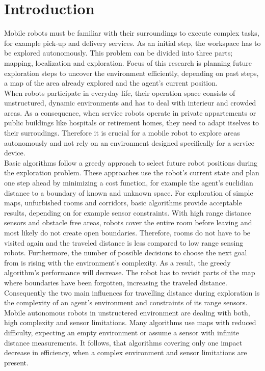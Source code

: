 \documentclass[twocolumn]{svjour3}[2016]
\begin{document}
\section{Introduction}
\label{introduction}
Mobile robots must be familiar with their surroundings to execute complex tasks, for example pick-up and delivery services. As an initial step, the workspace has to be explored autonomously. This problem can be divided into three parts; mapping, localization and exploration. Focus of this research is planning future exploration steps to uncover the environment efficiently, depending on past steps, a map of the area already explored and the agent's current position.\\
When robots participate in everyday life, their operation space consists of unstructured, dynamic environments and has to deal with interieur and crowded areas.
As a consequence, when service robots operate in private appartements or public buildings like hospitals or retirement homes, they need to adapt itselves to their surroudings.
Therefore it is crucial for a mobile robot to explore areas autonomously and not rely on an environment designed specifically for a service device.\\
Basic algorithms follow a greedy approach to select future robot positions during the exploration problem. These approaches use the robot's current state and plan one step ahead by minimizing a cost function, for example the agent's euclidian distance to a boundary of known and unknown space. For exploration of simple maps, unfurbished rooms and corridors, basic algorithms provide acceptable results, depending on for example sensor constraints. With high range distance sensors and obstacle free areas, robots cover the entire room before leaving and most likely do not create open boundaries. Therefore, rooms do not have to be visited again and the traveled distance is less compared to low range sensing robots. Furthermore, the number of possible decisions to choose the next goal from is rising with the environment's complexity. As a result, the greedy algorithm's performance will decrease. The robot has to revisit parts of the map where boundaries have been forgotten, increasing the traveled distance.\\
Consequently the two main influences for travelling distance during exploration is the complexity of an agent's environment and constraints of its range sensors. Mobile autonomous robots in unstructered environment are dealing with both, high complexity and sensor limitations. Many algorithms use maps with reduced difficulty, expecting an empty environment or assume a sensor with infinite distance measurements. It follows, that algorithms covering only one impact decrease in efficiency, when a complex environment and sensor limitations are present.\\
\end{document}
